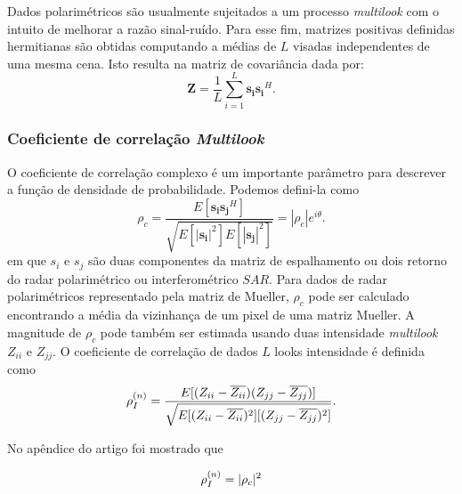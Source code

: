 \documentclass[12pt,a4paper]{article}
\begin{document}
Dados polarimétricos são usualmente sujeitados a um processo {\it multilook} com o intuito de melhorar a razão sinal-ruído.
Para esse fim, matrizes positivas definidas hermitianas são obtidas computando a médias de $L$ visadas 
independentes de uma mesma cena. Isto resulta na matriz de covariância {} dada por:
\begin{equation}\label{eqn7}
	\mathbf{Z}=\frac{1}{L}\sum_{i=1}^{L} \mathbf{s_is_i}^H .
\end{equation}

\subsubsection{Coeficiente de correlação {\it Multilook}}

O coeficiente de correlação complexo é um importante parâmetro para descrever a função de densidade de probabilidade. 
Podemos defini-la como
\begin{equation}\label{eqn8}
	\rho_c=\frac{E[\mathbf{s_is_j}^H]}{\sqrt{E[|\mathbf{s_i}|^2]E[|\mathbf{s_j}|^2]}} =|\rho_c|e^{i\theta}.
\end{equation}
em que {\boldmath $s_i$} e {\boldmath $s_j$} 
são duas componentes da matriz de espalhamento ou dois retorno do radar polarimétrico ou interferométrico $SAR$. Para dados de radar polarimétricos representado pela matriz de Mueller, $\rho_c$ pode ser calculado encontrando a média da vizinhança de um pixel de uma matriz Mueller. A magnitude de $\rho_c$ pode também ser estimada usando duas intensidade  {\it multilook} $Z_{ii}$ e $Z_{jj}$. O coeficiente de correlação de dados $L$ looks intensidade é definida como   
\begin{equation}\label{eqn9}
	\rho_I^{(n)}=\frac{E[(Z_{ii}-\overline{Z_{ii}})(Z_{jj}-\overline{Z_{jj}})]}{\sqrt{E[(Z_{ii}-\overline{Z_{ii}})^2][(Z_{jj}-\overline{Z_{jj}})^2]}}. \\
\end{equation}

No apêndice do artigo \cite{lee94} foi mostrado que 

\begin{equation}\label{eqn10}
	\rho_I^{(n)}= |\rho_c|^2\\
\end{equation}
\end{document}
